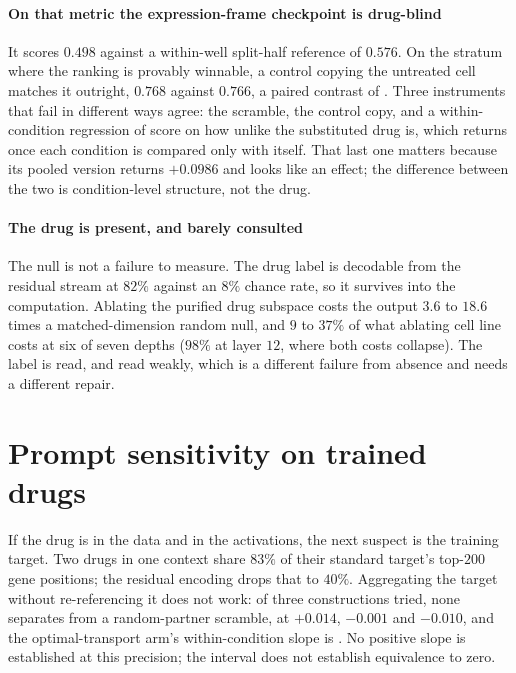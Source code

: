\paragraph{On that metric the expression-frame checkpoint is drug-blind} It
scores $0.498$ against a within-well split-half reference of $0.576$. On the
stratum where the ranking is provably winnable, a control copying the untreated
cell matches it outright, $0.768$ against $0.766$, a paired contrast of
. Three instruments that fail in different ways agree:
the scramble, the control copy, and a within-condition regression of score on how
unlike the substituted drug is, which returns  once
each condition is compared only with itself. That last one matters because its
pooled version returns $+0.0986$ and looks like an effect; the difference between
the two is condition-level structure, not the drug.

\paragraph{The drug is present, and barely consulted} The null is not a failure
to measure. The drug label is decodable from the residual stream at $82\%$
against an $8\%$ chance rate, so it survives into the computation. Ablating the
purified drug subspace costs the output $3.6$ to $18.6$ times a matched-dimension random null, and $9$ to $37\%$ of what ablating cell line costs at six of seven depths ($98\%$ at layer $12$, where both costs collapse). The label is
read, and read weakly, which is a different failure from absence and needs a
different repair.

\section{Prompt sensitivity on trained drugs}

If the drug is in the data and in the activations, the next suspect is the
training target. Two drugs in one context share $83\%$ of their standard target's top-$200$ gene positions; the residual encoding drops that to $40\%$. Aggregating the
target without re-referencing it does not work: of three constructions tried,
none separates from a random-partner scramble, at $+0.014$, $-0.001$ and
$-0.010$, and the optimal-transport arm's within-condition slope is
. No positive slope is established at this
precision; the interval does not establish equivalence to zero.

